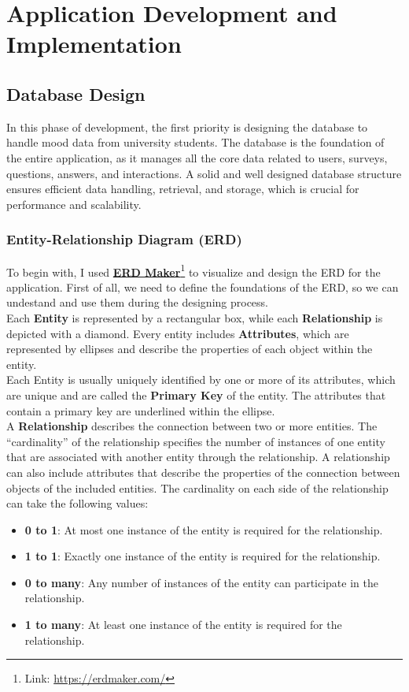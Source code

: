 \chapter{Application Development and Implementation}

\section{Database Design}
In this phase of development, the first priority is designing the database to handle mood data from university students. The database is the foundation of the entire application, as it manages all the core data related to users, surveys, questions, answers, and interactions. A solid and well designed database structure ensures efficient data handling, retrieval, and storage, which is crucial for performance and scalability.

\subsection{Entity-Relationship Diagram (ERD)}

To begin with, I used \textbf{\href{https://erdmaker.com/}{ERD Maker}}\footnote{Link: \url{https://erdmaker.com/}} to visualize and design the ERD for the application. First of all, we need to define the foundations of the ERD, so we can undestand and use them during the designing process. \vspace{5mm} \\
Each \textbf{Entity} is represented by a rectangular box, while each \textbf{Relationship} is depicted with a diamond. Every entity includes \textbf{Attributes}, which are represented by ellipses and describe the properties of each object within the entity.\vspace{5mm} \\
Each Entity is usually uniquely identified by one or more of its attributes, which are unique and are called the \textbf{Primary Key} of the entity. The attributes that contain a primary key are underlined within the ellipse.\vspace{5mm} \\
A \textbf{Relationship} describes the connection between two or more entities. The ``cardinality'' of the relationship specifies the number of instances of one entity that are associated with another entity through the relationship. A relationship can also include attributes that describe the properties of the connection between objects of the included entities. The cardinality on each side of the relationship can take the following values:
\begin{itemize}
    \item \textbf{0 to 1}: At most one instance of the entity is required for the relationship.
    \item \textbf{1 to 1}: Exactly one instance of the entity is required for the relationship.
    \item \textbf{0 to many}: Any number of instances of the entity can participate in the relationship.
    \item \textbf{1 to many}: At least one instance of the entity is required for the relationship.
\end{itemize}

